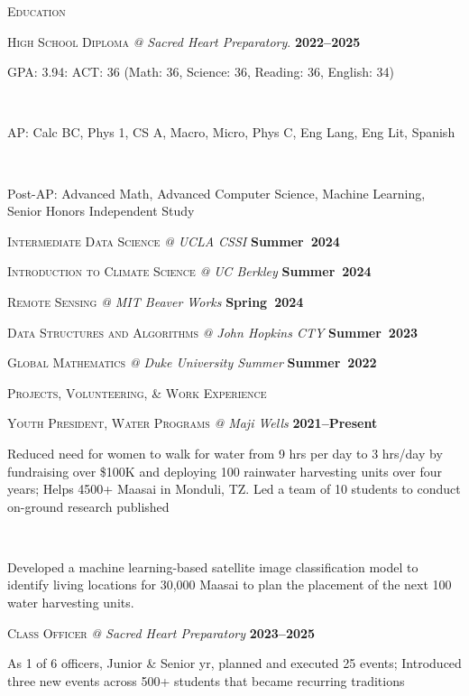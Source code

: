 \documentclass[10pt, letter]{article}
\newcommand{\dates}[1]{\hfill\mbox{\ttfamily\textbf{#1}}}
\newcommand{\smaller}[1]{%
    \noindent\makebox[1.2em][l]{$\diamond$}%
    \parbox[t]{\dimexpr\linewidth-1.5em}{\small#1}%
}
\newcommand{\headright}[1]{\vspace*{1.5ex}\textsc{\Large\color{cvcolor}#1}\par%
     \vspace*{-2ex}{\color{cvcolor}\hrulefill}\par}
\begin{document}
\begin{minipage}[t]{0.56\textwidth}
\setlength{\parskip}{0.6ex}%

\vspace{3ex}


\headright{Education}

\textsc{High School Diploma} \textit{@ Sacred Heart Preparatory}. \dates{2022--2025} \\
\smaller {GPA: 3.94: ACT: 36 (Math: 36, Science: 36, Reading: 36, English: 34)}\\
\smaller{AP: Calc BC, Phys 1, CS A,  Macro, Micro, Phys C, Eng Lang, Eng Lit, Spanish}\\
\smaller{Post-AP: Advanced Math, Advanced Computer Science, Machine Learning, Senior Honors Independent Study}

\textsc{Intermediate Data Science} \textit{@ UCLA CSSI} \dates{Summer 2024}

\textsc{Introduction to Climate Science} \textit{@ UC Berkley} \dates{Summer 2024}

\textsc{Remote Sensing} \textit{@ MIT Beaver Works} \dates{Spring 2024}

\textsc{Data Structures and Algorithms} \textit{@ John Hopkins CTY} \dates{Summer 2023}

\textsc{Global Mathematics} \textit{@ Duke University Summer} \dates{Summer 2022}



\headright{Projects, Volunteering, \& Work Experience}

\textsc{Youth President, Water Programs} \textit{@ Maji Wells}  \dates{2021--Present} \\
\smaller{Reduced need for women to walk for water from 9 hrs per day to 3 hrs/day by fundraising over \$100K and deploying 100 rainwater harvesting units over four years; Helps 4500+ Maasai in Monduli, TZ. Led a team of 10 students to conduct on-ground research published} \\
\smaller{Developed a machine learning-based satellite image classification model to identify living locations for 30,000 Maasai to plan the placement of the next 100 water harvesting units.}

\textsc{Class Officer} \textit{@ Sacred Heart Preparatory}  \dates{2023--2025} \\
\smaller{As 1 of 6 officers, Junior \& Senior yr, planned and executed 25 events; Introduced three new events across 500+ students that became recurring traditions}


\end{minipage}
\end{document}
